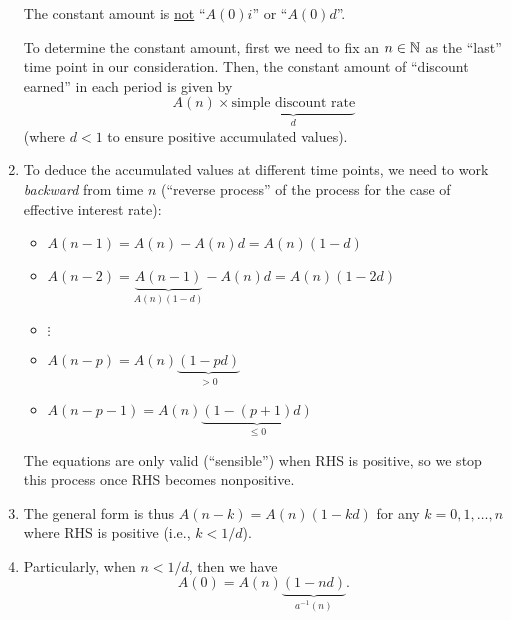 \begin{enumerate}
\begin{warning}
The constant amount is \underline{not} ``\(A(0)i\)'' or ``\(A(0)d\)''.
\end{warning}

To determine the constant amount, first we need to fix an \(n\in \mathbb{N}\) as the
``last'' time point in our consideration. Then, the constant amount of
``discount earned'' in each period is given by
\[
A(n)\times\underbrace{\text{simple discount rate}}_{d}
\]
(where \(d<1\) to ensure positive accumulated values).
\item To deduce the accumulated values at different time points, we need to
work \emph{backward} from time \(n\) (``reverse process'' of the process for
the case of effective interest rate):
\begin{itemize}
\item \(A(n-1)=A(n)-A(n)d=A(n)(1-d)\)
\item \(A(n-2)=\underbrace{A(n-1)}_{A(n)(1-d)}-A(n)d=A(n)(1-2d)\)
\item \(\vdots\)
\item \(A(n-p)=A(n)\underbrace{(1-pd)}_{>0}\) {\color{ForestGreen}}
\item \(A(n-p-1)=A(n)\underbrace{(1-(p+1)d)}_{\le 0}\) {\color{red}}
\end{itemize}
\begin{note}
The equations are only valid (``sensible'') when RHS is positive, so we stop
this process once RHS becomes nonpositive.
\end{note}
\item The general form is thus \(A(n-k)=A(n)(1-kd)\) for any \(k=0,1,\dotsc,n\)
where RHS is positive (i.e., \(k<1/d\)).
\item \label{it:simple-discount-a-inv} Particularly, when \(n<1/d\), then we
have
\[
A(0)=A(n)\underbrace{(1-nd)}_{a^{-1}(n)}.
\]
\begin{center}
\end{center}


\end{enumerate}
